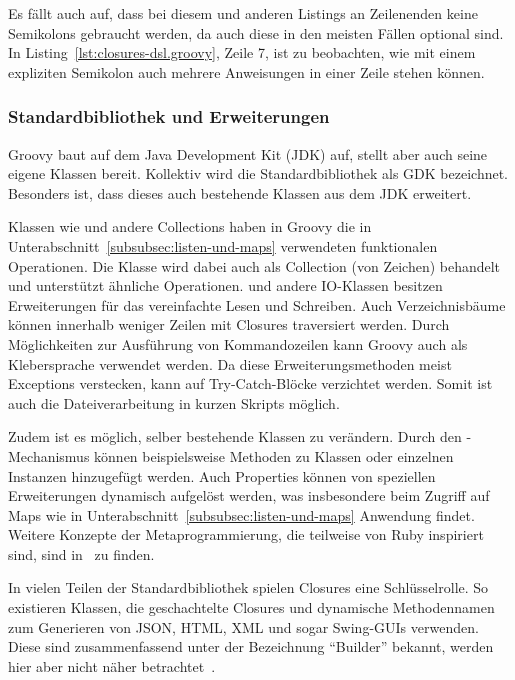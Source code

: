\documentclass[a4paper]{article}
\begin{document}
Es fällt auch auf, dass bei diesem und anderen Listings an Zeilenenden keine Semikolons gebraucht werden, da auch diese in den meisten Fällen optional sind.
In Listing~\ref{lst:closures-dsl.groovy}, Zeile 7, ist zu beobachten, wie mit einem expliziten Semikolon auch mehrere Anweisungen in einer Zeile stehen können.

\subsubsection{Standardbibliothek und Erweiterungen}\label{subsubsec:standard-bibliothek}

Groovy baut auf dem Java Development Kit (JDK) auf, stellt aber auch seine eigene Klassen bereit.
Kollektiv wird die Standardbibliothek als GDK bezeichnet.
Besonders ist, dass dieses auch bestehende Klassen aus dem JDK erweitert.

Klassen wie  und andere Collections haben in Groovy die in Unterabschnitt~\ref{subsubsec:listen-und-maps} verwendeten funktionalen Operationen.
Die Klasse  wird dabei auch als Collection (von Zeichen) behandelt und unterstützt ähnliche Operationen.
 und andere IO-Klassen besitzen Erweiterungen für das vereinfachte Lesen und Schreiben.
Auch Verzeichnisbäume können innerhalb weniger Zeilen mit Closures traversiert werden.
Durch Möglichkeiten zur Ausführung von Kommandozeilen kann Groovy auch als Klebersprache verwendet werden.
Da diese Erweiterungsmethoden meist Exceptions verstecken, kann auf Try-Catch-Blöcke verzichtet werden.
Somit ist auch die Dateiverarbeitung in kurzen Skripts möglich.

Zudem ist es möglich, selber bestehende Klassen zu verändern.
Durch den -Mechanismus können beispielsweise Methoden zu Klassen oder einzelnen Instanzen hinzugefügt werden.
Auch Properties können von speziellen Erweiterungen dynamisch aufgelöst werden, was insbesondere beim Zugriff auf Maps wie in Unterabschnitt~\ref{subsubsec:listen-und-maps} Anwendung findet.
Weitere Konzepte der Metaprogrammierung, die teilweise von Ruby inspiriert sind, sind in~\cite[Abs.~3.4.]{groovy-lang:documentation} zu finden.

In vielen Teilen der Standardbibliothek spielen Closures eine Schlüsselrolle.
So existieren Klassen, die geschachtelte Closures und dynamische Methodennamen zum Generieren von JSON, HTML, XML und sogar Swing-GUIs verwenden.
Diese sind zusammenfassend unter der Bezeichnung ``Builder'' bekannt, werden hier aber nicht näher betrachtet~\cite[Abs.~3.15.8]{groovy-lang:documentation}.
\end{document}
